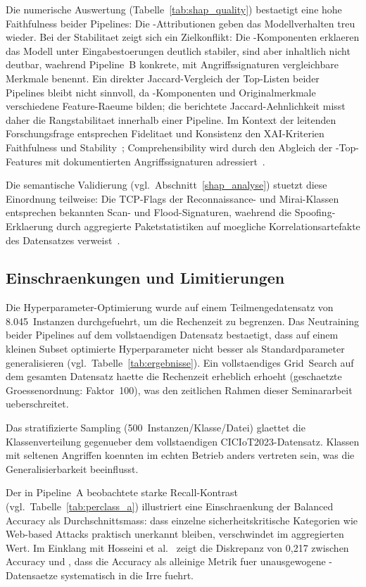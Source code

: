 Die numerische Auswertung (Tabelle~\ref{tab:shap_quality}) bestaetigt eine hohe Faithfulness
beider Pipelines: Die \shap{}-Attributionen geben das Modellverhalten treu wieder.
Bei der Stabilitaet zeigt sich ein Zielkonflikt: Die \pca{}-Komponenten erklaeren das Modell
unter Eingabestoerungen deutlich stabiler, sind aber inhaltlich nicht deutbar, waehrend
Pipeline~B konkrete, mit Angriffssignaturen vergleichbare Merkmale benennt.
Ein direkter Jaccard-Vergleich der Top-Listen beider Pipelines bleibt nicht sinnvoll, da
\pca{}-Komponenten und Originalmerkmale verschiedene Feature-Raeume bilden; die berichtete
Jaccard-Aehnlichkeit misst daher die Rangstabilitaet innerhalb einer Pipeline.
Im Kontext der leitenden Forschungsfrage entsprechen Fidelitaet und Konsistenz den XAI-Kriterien
Faithfulness und Stability~\cite{hermosilla2025xai_forensic}; Comprehensibility wird durch
den Abgleich der \shap{}-Top-Features mit dokumentierten Angriffssignaturen adressiert~\cite{neto2023ciciot2023}.

Die semantische Validierung (vgl.\ Abschnitt~\ref{shap_analyse}) stuetzt diese Einordnung
teilweise: Die TCP-Flags der Reconnaissance- und Mirai-Klassen entsprechen bekannten Scan- und
Flood-Signaturen, waehrend die Spoofing-Erklaerung durch aggregierte Paketstatistiken auf
moegliche Korrelationsartefakte des Datensatzes verweist~\cite{neto2023ciciot2023}.

\subsection{Einschraenkungen und Limitierungen}

Die Hyperparameter-Optimierung wurde auf einem Teilmengedatensatz von 8.045~Instanzen
durchgefuehrt, um die Rechenzeit zu begrenzen.
Das Neutraining beider Pipelines auf dem vollstaendigen Datensatz bestaetigt, dass
auf einem kleinen Subset optimierte Hyperparameter nicht besser als Standardparameter
generalisieren (vgl.\ Tabelle~\ref{tab:ergebnisse}).
Ein vollstaendiges Grid~Search auf dem gesamten Datensatz haette die Rechenzeit erheblich
erhoeht (geschaetzte Groessenordnung: Faktor~100), was den zeitlichen Rahmen dieser
Seminararbeit ueberschreitet.

Das stratifizierte Sampling (500~Instanzen/Klasse/Datei) glaettet die
Klassenverteilung gegenueber dem vollstaendigen CICIoT2023-Datensatz.
Klassen mit seltenen Angriffen koennten im echten Betrieb anders vertreten sein, was
die Generalisierbarkeit beeinflusst.

Der in Pipeline~A beobachtete starke Recall-Kontrast (vgl.\ Tabelle~\ref{tab:perclass_a})
illustriert eine Einschraenkung der Balanced Accuracy als Durchschnittsmass: dass einzelne
sicherheitskritische Kategorien wie Web-based Attacks praktisch unerkannt bleiben, verschwindet
im aggregierten Wert.
Im Einklang mit Hosseini et al.\ \cite{hosseini2025imbalance} zeigt die Diskrepanz von
0{,}217 zwischen Accuracy und \ba{}, dass die Accuracy als alleinige Metrik fuer
unausgewogene \ids{}-Datensaetze systematisch in die Irre fuehrt.
